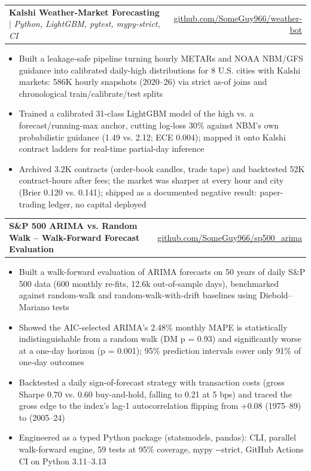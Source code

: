 \documentclass[letterpaper,11pt]{article}
\makeatletter
\newcommand{\weblink}[2]{\href{#1}{\underline{#2}}}
\newcommand{\resumeItem}[1]{\item\small{#1}}
\newcommand{\resumeProjectHeading}[2]{
  \item
    \begin{tabular*}{\textwidth}[t]{l@{\extracolsep{\fill}}r}
      #1 & #2
    \end{tabular*}
}
\newcommand{\resumeItemListStart}{\begin{itemize}[leftmargin=0.15in,labelsep=5pt,label=\textbullet,itemsep=-1pt,topsep=0pt,parsep=0pt]}
\newcommand{\resumeItemListEnd}{\end{itemize}}
\makeatother
\begin{document}
    \resumeProjectHeading
      {\textbf{Kalshi Weather-Market Forecasting} $|$ \emph{Python, LightGBM, pytest, mypy-strict, CI}}
      {\small\weblink{https://github.com/SomeGuy966/weather-bot}{github.com/SomeGuy966/weather-bot}}
      \resumeItemListStart
        \resumeItem{Built a leakage-safe pipeline turning hourly METARs and NOAA NBM/GFS guidance into calibrated daily-high distributions for 8 U.S. cities with Kalshi markets: 586K hourly snapshots (2020--26) via strict as-of joins and chronological train/calibrate/test splits}
        \resumeItem{Trained a calibrated 31-class LightGBM model of the high vs. a forecast/running-max anchor, cutting log-loss 30\% against NBM's own probabilistic guidance (1.49 vs. 2.12; ECE 0.004); mapped it onto Kalshi contract ladders for real-time partial-day inference}
        \resumeItem{Archived 3.2K contracts (order-book candles, trade tape) and backtested 52K contract-hours after fees; the market was sharper at every hour and city (Brier 0.120 vs. 0.141); shipped as a documented negative result: paper-trading ledger, no capital deployed}
      \resumeItemListEnd

    \resumeProjectHeading
      {\textbf{S\&P 500 ARIMA vs. Random Walk -- Walk-Forward Forecast Evaluation}}
      {\small\weblink{https://github.com/SomeGuy966/sp500_arima}{github.com/SomeGuy966/sp500\_arima}}
      \resumeItemListStart
        \resumeItem{Built a walk-forward evaluation of ARIMA forecasts on 50 years of daily S\&P 500 data (600 monthly re-fits, 12.6k out-of-sample days), benchmarked against random-walk and random-walk-with-drift baselines using Diebold--Mariano tests}
        \resumeItem{Showed the AIC-selected ARIMA's 2.48\% monthly MAPE is statistically indistinguishable from a random walk (DM p = 0.93) and significantly worse at a one-day horizon (p = 0.001); 95\% prediction intervals cover only 91\% of one-day outcomes}
        \resumeItem{Backtested a daily sign-of-forecast strategy with transaction costs (gross Sharpe 0.70 vs. 0.60 buy-and-hold, falling to 0.21 at 5 bps) and traced the gross edge to the index's lag-1 autocorrelation flipping from +0.08 (1975--89) to \textminus0.12 (2005--24)}
        \resumeItem{Engineered as a typed Python package (statsmodels, pandas): CLI, parallel walk-forward engine, 59 tests at 95\% coverage, mypy -{}-strict, GitHub Actions CI on Python 3.11--3.13}
      \resumeItemListEnd
\end{document}
